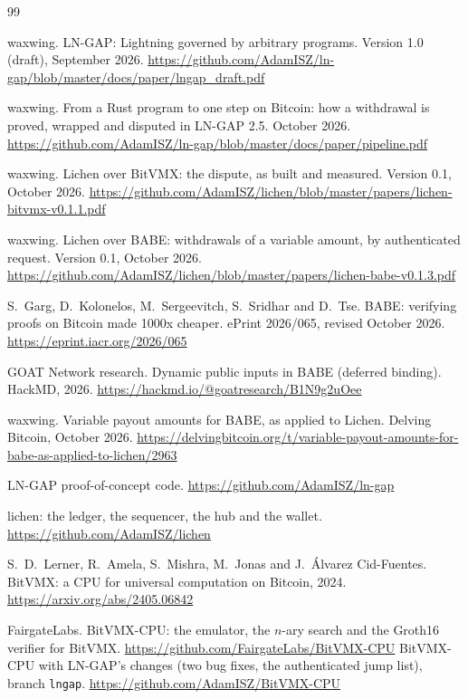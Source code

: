 \documentclass[11pt]{article}
\begin{document}
\begin{thebibliography}{99}

 waxwing. LN-GAP: Lightning governed by arbitrary programs. Version 1.0 (draft), September 2026. \url{https://github.com/AdamISZ/ln-gap/blob/master/docs/paper/lngap_draft.pdf}

 waxwing. From a Rust program to one step on Bitcoin: how a withdrawal is proved, wrapped and disputed in LN-GAP 2.5. October 2026. \url{https://github.com/AdamISZ/ln-gap/blob/master/docs/paper/pipeline.pdf}

 waxwing. Lichen over BitVMX: the dispute, as built and measured. Version 0.1, October 2026. \url{https://github.com/AdamISZ/lichen/blob/master/papers/lichen-bitvmx-v0.1.1.pdf}

 waxwing. Lichen over BABE: withdrawals of a variable amount, by authenticated request. Version 0.1, October 2026. \url{https://github.com/AdamISZ/lichen/blob/master/papers/lichen-babe-v0.1.3.pdf}

 S.~Garg, D.~Kolonelos, M.~Sergeevitch, S.~Sridhar and D.~Tse. BABE: verifying proofs on Bitcoin made 1000x cheaper. ePrint 2026/065, revised October 2026. \url{https://eprint.iacr.org/2026/065}

 GOAT Network research. Dynamic public inputs in BABE (deferred binding). HackMD, 2026. \url{https://hackmd.io/@goatresearch/B1N9g2uOee}

 waxwing. Variable payout amounts for BABE, as applied to Lichen. Delving Bitcoin, October 2026. \url{https://delvingbitcoin.org/t/variable-payout-amounts-for-babe-as-applied-to-lichen/2963}

 LN-GAP proof-of-concept code. \url{https://github.com/AdamISZ/ln-gap}

 lichen: the ledger, the sequencer, the hub and the wallet. \url{https://github.com/AdamISZ/lichen}

 S.~D.~Lerner, R.~Amela, S.~Mishra, M.~Jonas and J.~\'Alvarez Cid-Fuentes. BitVMX: a CPU for universal computation on Bitcoin, 2024. \url{https://arxiv.org/abs/2405.06842}

 FairgateLabs. BitVMX-CPU: the emulator, the $n$-ary search and the Groth16 verifier for BitVMX. \url{https://github.com/FairgateLabs/BitVMX-CPU}
 BitVMX-CPU with LN-GAP's changes (two bug fixes, the authenticated jump list), branch \texttt{lngap}. \url{https://github.com/AdamISZ/BitVMX-CPU}


\end{thebibliography}
\end{document}
